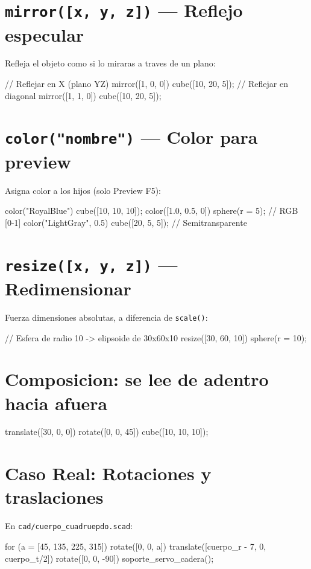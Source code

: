 \documentclass[12pt, oneside, a4paper]{report}
\newcommand{\codigo}[1]{\texttt{#1}}
\begin{document}
\section{\codigo{mirror([x, y, z])} --- Reflejo especular}
Refleja el objeto como si lo miraras a traves de un plano:
\begin{openscad}
// Reflejar en X (plano YZ)
mirror([1, 0, 0]) cube([10, 20, 5]);
// Reflejar en diagonal
mirror([1, 1, 0]) cube([10, 20, 5]);
\end{openscad}

\section{\codigo{color("nombre")} --- Color para preview}
Asigna color a los hijos (solo Preview F5):
\begin{openscad}
color("RoyalBlue") cube([10, 10, 10]);
color([1.0, 0.5, 0]) sphere(r = 5);      // RGB [0-1]
color("LightGray", 0.5) cube([20, 5, 5]); // Semitransparente
\end{openscad}

\section{\codigo{resize([x, y, z])} --- Redimensionar}
Fuerza dimensiones absolutas, a diferencia de \codigo{scale()}:
\begin{openscad}
// Esfera de radio 10 -> elipsoide de 30x60x10
resize([30, 60, 10]) sphere(r = 10);
\end{openscad}

\section{Composicion: se lee de adentro hacia afuera}
\begin{openscad}
translate([30, 0, 0])
    rotate([0, 0, 45])
        cube([10, 10, 10]);
\end{openscad}

\section{Caso Real: Rotaciones y traslaciones}
En \codigo{cad/cuerpo\_cuadruepdo.scad}:
\begin{openscad}
for (a = [45, 135, 225, 315]) {
    rotate([0, 0, a])
        translate([cuerpo_r - 7, 0, cuerpo_t/2])
            rotate([0, 0, -90])
                soporte_servo_cadera();
}
\end{openscad}
\end{document}
